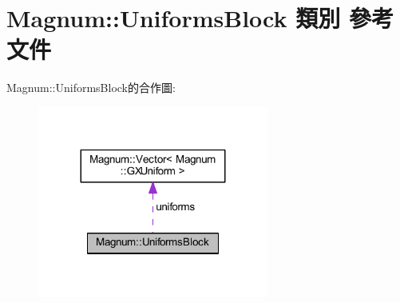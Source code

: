 \hypertarget{class_magnum_1_1_uniforms_block}{}\section{Magnum\+:\+:Uniforms\+Block 類別 參考文件}
\label{class_magnum_1_1_uniforms_block}


Magnum\+:\+:Uniforms\+Block的合作圖\+:\nopagebreak
\begin{figure}[H]
\begin{center}
\leavevmode
\includegraphics[width=215pt]{class_magnum_1_1_uniforms_block__coll__graph}
\end{center}
\end{figure}
